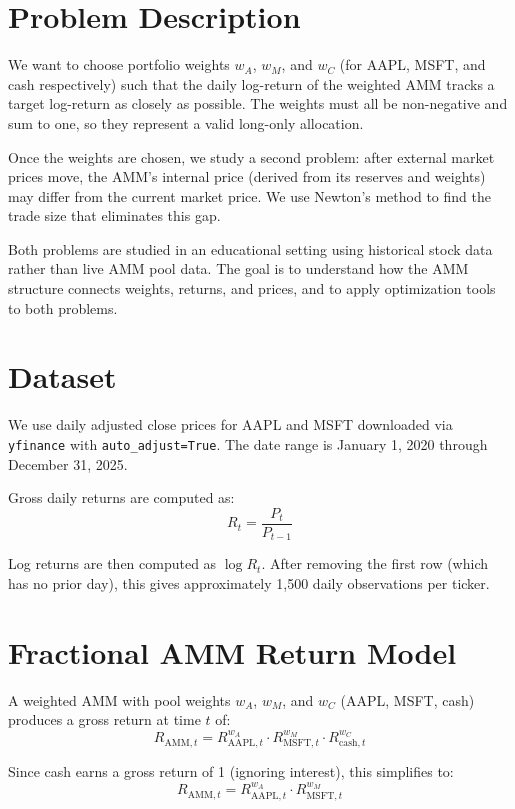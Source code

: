 \documentclass[12pt]{article}
\begin{document}
\section{Problem Description}

We want to choose portfolio weights $w_A$, $w_M$, and $w_C$ (for AAPL, MSFT, and cash respectively) such that the daily log-return of the weighted AMM tracks a target log-return as closely as possible. The weights must all be non-negative and sum to one, so they represent a valid long-only allocation.

Once the weights are chosen, we study a second problem: after external market prices move, the AMM's internal price (derived from its reserves and weights) may differ from the current market price. We use Newton's method to find the trade size that eliminates this gap.

Both problems are studied in an educational setting using historical stock data rather than live AMM pool data. The goal is to understand how the AMM structure connects weights, returns, and prices, and to apply optimization tools to both problems.

\section{Dataset}

We use daily adjusted close prices for AAPL and MSFT downloaded via \texttt{yfinance} with \texttt{auto\_adjust=True}. The date range is January 1, 2020 through December 31, 2025.

Gross daily returns are computed as:
\[
R_t = \frac{P_t}{P_{t-1}}
\]

Log returns are then computed as $\log R_t$. After removing the first row (which has no prior day), this gives approximately 1,500 daily observations per ticker.

\section{Fractional AMM Return Model}

A weighted AMM with pool weights $w_A$, $w_M$, and $w_C$ (AAPL, MSFT, cash) produces a gross return at time $t$ of:
\[
R_{\text{AMM},t} = R_{\text{AAPL},t}^{w_A} \cdot R_{\text{MSFT},t}^{w_M} \cdot R_{\text{cash},t}^{w_C}
\]

Since cash earns a gross return of 1 (ignoring interest), this simplifies to:
\[
R_{\text{AMM},t} = R_{\text{AAPL},t}^{w_A} \cdot R_{\text{MSFT},t}^{w_M}
\]
\end{document}
